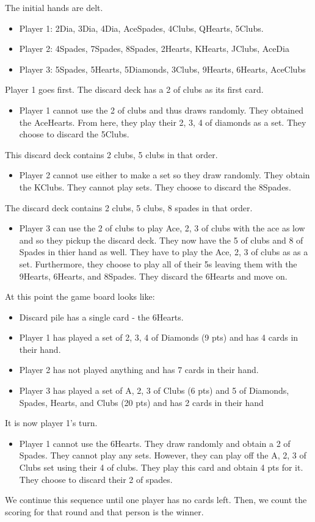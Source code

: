 \documentclass{article}
\begin{document}
The initial hands are delt. 
\begin{itemize}
  \item Player 1: 2Dia, 3Dia, 4Dia, AceSpades, 4Clubs, QHearts, 5Clubs. 
  \item Player 2: 4Spades, 7Spades, 8Spades, 2Hearts, KHearts, JClubs, AceDia
  \item Player 3: 5Spades, 5Hearts, 5Diamonds, 3Clubs, 9Hearts, 6Hearts, AceClubs
\end{itemize}
Player 1 goes first. The discard deck has a 2 of clubs as its first card. 
\begin{itemize} 
  \item Player 1 cannot use the 2 of clubs and thus draws randomly. They obtained the AceHearts. From here, they play their 2, 3, 4 of diamonds as a set. They choose to discard the 5Clubs. 
 \end{itemize}
 This discard deck contains 2 clubs, 5 clubs in that order. 
 \begin{itemize}
   \item Player 2 cannot use either to make a set so they draw randomly. They obtain the KClubs. They cannot play sets. They choose to discard the 8Spades. 
 \end{itemize}
 The discard deck contains 2 clubs, 5 clubs, 8 spades in that order. 
 \begin{itemize}
   \item Player 3 can use the 2 of clubs to play Ace, 2, 3 of clubs with the ace as low and so they pickup the discard deck. They now have the 5 of clubs and 8 of Spades in thier hand as well. They have to play the Ace, 2, 3 of clubs as as a set. Furthermore, they choose to play all of their 5s leaving them with the 9Hearts, 6Hearts, and 8Spades. They discard the 6Hearts and move on.
 \end{itemize}
 At this point the game board looks like:
 \begin{itemize}
   \item Discard pile has a single card - the 6Hearts.
   \item Player 1 has played a set of 2, 3, 4 of Diamonds (9 pts) and has 4 cards in their hand.
   \item Player 2 has not played anything and has 7 cards in their hand. 
   \item Player 3 has played a set of A, 2, 3 of Clubs (6 pts) and 5 of Diamonds, Spades, Hearts, and Clubs (20 pts) and has 2 cards in their hand
 \end{itemize}
 It is now player 1's turn. 
 \begin{itemize}
   \item Player 1 cannot use the 6Hearts. They draw randomly and obtain a 2 of Spades. They cannot play any sets. However, they can play off the A, 2, 3 of Clubs set using their 4 of clubs. They play this card and obtain 4 pts for it. They choose to discard their 2 of spades. \end{itemize}
  We continue this sequence until one player has no cards left. Then, we count the scoring for that round and that person is the winner. 
\end{document}
